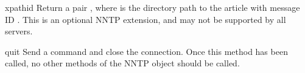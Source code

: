 \begin{methoddesc}{xpath}{id}
Return a pair , where  is the
directory path to the article with message ID .  This is an
optional NNTP extension, and may not be supported by all servers.
\end{methoddesc}

\begin{methoddesc}{quit}{}
Send a  command and close the connection.  Once this method
has been called, no other methods of the NNTP object should be called.
\end{methoddesc}
